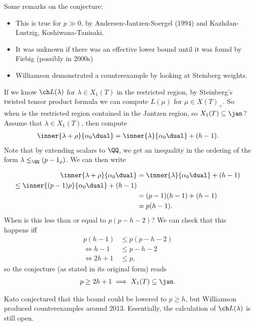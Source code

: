 \begin{remark}

Some remarks on the conjecture:

\begin{itemize}
\item
  This is true for \(p\gg 0\), by Andersen-Jantzen-Soergel (1994) and
  Kazhdan-Lustzig, Koshiwana-Tanisaki.
\item
  It was unknown if there was an effective lower bound until it was
  found by Fiebig (possibly in 2000s)
\item
  Williamson demonstrated a counterexample by looking at Steinberg
  weights.
\end{itemize}

\end{remark}

If we know \(\ch L(\lambda)\) for \(\lambda \in X_1(T)\) in the
restricted region, by Steinberg's twisted tensor product formula we can
compute \(L(\mu)\) for \(\mu \in X(T)_+\). So when is the restricted
region contained in the Jantzen region, so \(X_1(T) \subseteq \jan\)?
Assume that \(\lambda \in X_1(T)\), then compute
\begin{align*}  
\inner{\lambda+\rho}{\alpha_0\dual} = \inner{\lambda}{\alpha_0\dual} + (h-1)
.\end{align*} Note that by extending scalars to \(\QQ\), we get an
inequality in the ordering of the form \(\lambda \leq_\QQ (p-1_\rho)\).
We can then write

\begin{align*}  
\inner{\lambda+\rho}{\alpha_0\dual} 
&= \inner{\lambda}{\alpha_0\dual} + (h-1) \\
\leq \inner{(p-1) \rho}{\alpha_0\dual} + (h-1)  \\
&= (p-1)(h-1) + (h-1) \\
&= p(h-1) 
.\end{align*} When is this less than or equal to \(p(p-h-2)\)? We can
check that this happens iff
\begin{align*}  
p(h-1) &\leq p(p-h-2) \\
\iff h-1 &\leq p-h-2 \\
\iff 2h+1 &\leq p
,\end{align*} so the conjecture (as stated in its original form) reads
\begin{align*}  
p\geq 2h+1 \implies X_1(T) \subseteq \jan
.\end{align*}

\begin{remark}

Kato conjectured that this bound could be lowered to \(p\geq h\), but
Williamson produced counterexamples around 2013. Essentially, the
calculation of \(\ch L(\lambda)\) is still open.

\end{remark}

